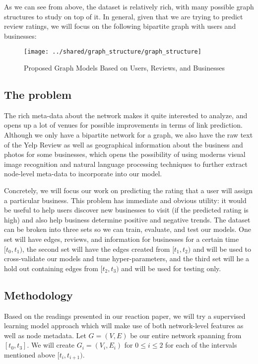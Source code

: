 \documentclass[letterpaper, 11 pt, conference]{ieeeconf}  %
\begin{document}
As we can see from above, the dataset is relatively rich, with many possible graph structures to study on top of it. In general, given that we are trying to predict review ratings, we will focus on the following bipartite graph with users and businesses:

\begin{figure}
\centering
\texttt{[image: ../shared/graph\_structure/graph\_structure]}
\caption{Proposed Graph Models Based on Users, Reviews, and Businesses}
\label{fig:graph_structure}
\end{figure}

\subsection{The problem}
The rich meta-data about the network makes it quite interested to analyze, and opens up a lot of venues for possible improvements in terms of link prediction. Although we only have a bipartite network for a graph, we also have the raw text of the Yelp Review as well as geographical information about the business and photos for some businesses, which opens the possibility of using moderns visual image recognition and natural language processing techniques to further extract node-level meta-data to incorporate into our model.

Concretely, we will focus our work on predicting the rating that a user will assign a particular business. This problem has immediate and obvious utility: it would be useful to help users discover new businesses to visit (if the predicted rating is high) and also help business determine positive and negative trends. The dataset can be broken into three sets so we can train, evaluate, and test our models. One set will have edges, reviews, and information for businesses for a certain time $[t_0, t_1)$, the second set will have the edges created from $[t_1, t_2)$ and will be used to cross-validate our models and tune hyper-parameters, and the third set will he a hold out containing edges from $[t_2, t_3)$ and will be used for testing only.

\subsection{Methodology}
Based on the readings presented in our reaction paper, we will try a supervised learning model approach which will make use of both network-level features as well as node metadata. Let $G = (V,E)$ be our entire network spanning from $[t_0, t_3]$. We will create $G_i = (V_i, E_i)$ for $0 \leq i \leq 2$ for each of the intervals mentioned above $[t_i, t_{i+1})$.
\end{document}
